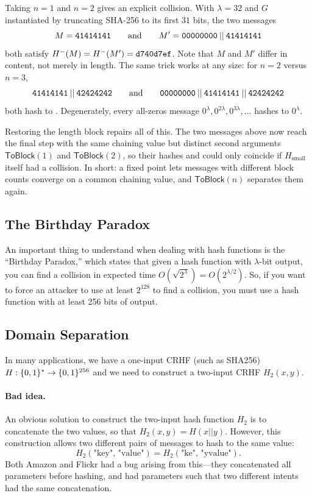 Taking $n = 1$ and $n = 2$ gives an explicit collision.
With $\lambda = 32$ and $G$ instantiated by truncating \textsf{SHA-256}
to its first $31$ bits, the two messages
\[
  M = \ttt{41414141}
  \qquad\text{and}\qquad
  M' = \ttt{00000000} \concat \ttt{41414141}
\]
both satisfy $H^-(M) = H^-(M') = \ttt{d740d7ef}$.
Note that $M$ and $M'$ differ in content, not merely in length.
The same trick works at any size: for $n = 2$ versus $n = 3$,
\[
  \ttt{41414141} \concat \ttt{42424242}
  \qquad\text{and}\qquad
  \ttt{00000000} \concat \ttt{41414141} \concat \ttt{42424242}
\]
both hash to . Degenerately, every all-zeros message
$0^{\lambda}, 0^{2\lambda}, 0^{3\lambda}, \dots$ hashes to $0^{\lambda}$.

Restoring the length block repairs all of this.
The two messages above now reach the final step with the same chaining
value  but distinct second arguments
$\mathsf{ToBlock}(1)$ and $\mathsf{ToBlock}(2)$, so their hashes
 and  could only coincide if
$H_\text{small}$ itself had a collision.
In short: a fixed point lets messages with different block counts converge
on a common chaining value, and $\mathsf{ToBlock}(n)$ separates them again.

\subsection{The Birthday Paradox}
An important thing to understand when dealing with hash functions is the ``Birthday Paradox,'' 
which states that given a hash function with $\lambda$-bit output, you can 
find a collision in expected time $O(\sqrt{2^\lambda}) = O(2^{\lambda/2})$.
So, if you want to force an attacker to use at least $2^{128}$ to find a collision,
you must use a hash function with at least 256 bits of output.

\subsection{Domain Separation}
In many applications, we have a one-input CRHF (such as SHA256) $H: \{0,1\}^* \rightarrow \{0,1\}^{256}$ 
and we need to construct a two-input CRHF $H_2(x, y)$. 

\paragraph{Bad idea.} An obvious solution to construct the two-input hash function $H_2$ 
is to concatenate the two values, so that $H_2(x, y) = H(x || y)$.
However, this construction allows two different pairs of messages to hash to the same value:
\[H_2(\text{"key", "value"}) = H_2(\text{"ke", "yvalue"}).\]
Both Amazon and Flickr had a bug arising from
this---they concatenated all parameters before
hashing, and had parameters such that two
different intents had the same concatenation.\autocite{flickr}

